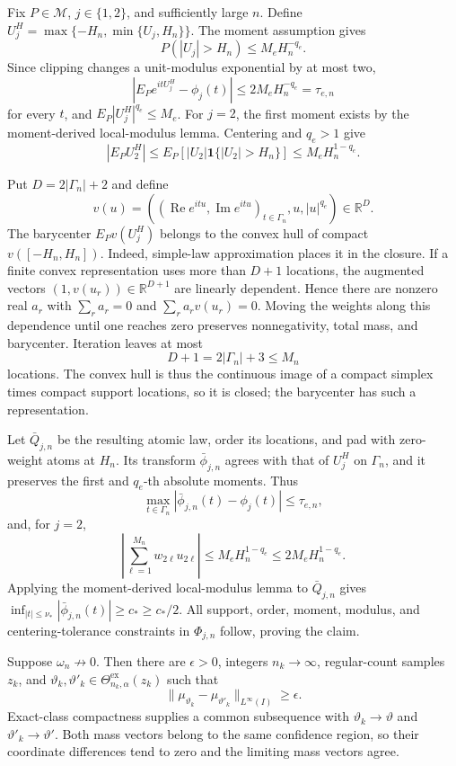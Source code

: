 Fix \(P\in\mathcal M\), \(j\in\{1,2\}\), and sufficiently large \(n\). Define \(U_j^H=\max\{-H_n,\min\{U_j,H_n\}\}\). The moment assumption gives
\[
 P(|U_j|>H_n)\le M_eH_n^{-q_e}.
\]
Since clipping changes a unit-modulus exponential by at most two,
\[
 |E_Pe^{itU_j^H}-\phi_j(t)|
 \le2M_eH_n^{-q_e}=\tau_{e,n}
\]
for every \(t\), and \(E_P|U_j^H|^{q_e}\le M_e\). For \(j=2\), the first moment exists by the moment-derived local-modulus lemma. Centering and \(q_e>1\) give
\[
 |E_PU_2^H|
 \le E_P[|U_2|\mathbf1\{|U_2|>H_n\}]
 \le M_eH_n^{1-q_e}.
\]

Put \(D=2|\Gamma_n|+2\) and define
\[
 v(u)=\left((\operatorname{Re}e^{itu},\operatorname{Im}e^{itu})_{t\in\Gamma_n},u,|u|^{q_e}\right)\in\mathbb R^D.
\]
The barycenter \(E_Pv(U_j^H)\) belongs to the convex hull of compact \(v([-H_n,H_n])\). Indeed, simple-law approximation places it in the closure. If a finite convex representation uses more than \(D+1\) locations, the augmented vectors \((1,v(u_r))\in\mathbb R^{D+1}\) are linearly dependent. Hence there are nonzero real \(a_r\) with \(\sum_ra_r=0\) and \(\sum_ra_rv(u_r)=0\). Moving the weights along this dependence until one reaches zero preserves nonnegativity, total mass, and barycenter. Iteration leaves at most
\[
 D+1=2|\Gamma_n|+3\le M_n
\]
locations. The convex hull is thus the continuous image of a compact simplex times compact support locations, so it is closed; the barycenter has such a representation.

Let \(\bar Q_{j,n}\) be the resulting atomic law, order its locations, and pad with zero-weight atoms at \(H_n\). Its transform \(\bar\phi_{j,n}\) agrees with that of \(U_j^H\) on \(\Gamma_n\), and it preserves the first and \(q_e\)-th absolute moments. Thus
\[
 \max_{t\in\Gamma_n}|\bar\phi_{j,n}(t)-\phi_j(t)|\le\tau_{e,n},
\]
and, for \(j=2\),
\[
 \left|\sum_{\ell=1}^{M_n}w_{2\ell}u_{2\ell}\right|
 \le M_eH_n^{1-q_e}\le2M_eH_n^{1-q_e}.
\]
Applying the moment-derived local-modulus lemma to \(\bar Q_{j,n}\) gives \(\inf_{|t|\le\nu_*}|\bar\phi_{j,n}(t)|\ge c_*\ge c_*/2\). All support, order, moment, modulus, and centering-tolerance constraints in \(\Phi_{j,n}\) follow, proving the claim.

Suppose \(\omega_n\not\to0\). Then there are \(\epsilon>0\), integers \(n_k\to\infty\), regular-count samples \(z_k\), and \(\vartheta_k,\vartheta'_k\in\Theta^{\mathrm{ex}}_{n_k,\alpha}(z_k)\) such that
\[
 \|\mu_{\vartheta_k}-\mu_{\vartheta'_k}\|_{L^\infty(I)}\ge\epsilon.
\]
Exact-class compactness supplies a common subsequence with \(\vartheta_k\to\vartheta\) and \(\vartheta'_k\to\vartheta'\). Both mass vectors belong to the same confidence region, so their coordinate differences tend to zero and the limiting mass vectors agree.

